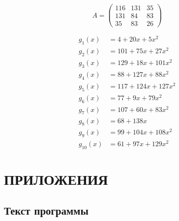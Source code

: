 \documentclass[a4paper,12pt]{article}
\begin{document}
	\[
	A = \begin{pmatrix}
		116 & 131 & 35 \\
		131 & 84  & 83 \\
		35  & 83  & 26
	\end{pmatrix}
	\]
	
	\begin{align*}	
		g_1(x) &= 4 + 20 x + 5 x^2      \\
		g_2(x) &= 101 + 75 x + 27 x^2   \\
		g_3(x) &= 129 + 18 x + 101 x^2  \\
		g_4(x) &= 88 + 127 x + 88 x^2   \\
		g_5(x) &= 117 + 124 x + 127 x^2 \\
		g_6(x) &= 77 + 9 x + 79 x^2	    \\
		g_7(x) &= 107 + 60 x + 83 x^2   \\
		g_8(x) &= 68 + 138 x            \\
		g_9(x) &= 99 + 104 x + 108 x^2  \\
		g_{10}(x) &= 61 + 97 x + 129 x^2
	\end{align*}
	
	\newpage
	\renewcommand\thesubsection{\Asbuk{subsection}}
	
	\section*{ПРИЛОЖЕНИЯ}
		\subsection{Текст программы} \label{program}
	

	
		
\end{document}
